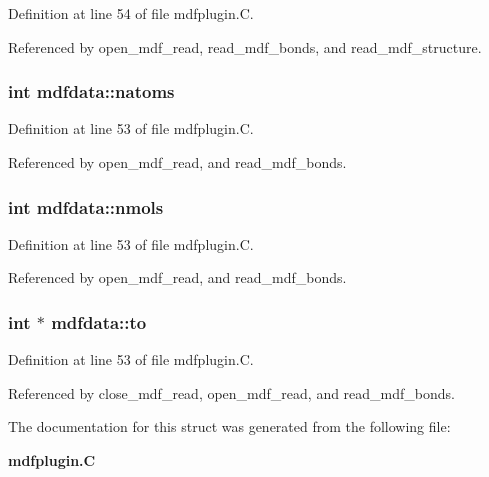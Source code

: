 Definition at line 54 of file mdfplugin.C.

Referenced by open\_\-mdf\_\-read, read\_\-mdf\_\-bonds, and read\_\-mdf\_\-structure.
\subsubsection{\setlength{\rightskip}{0pt plus 5cm}int mdfdata::natoms}\label{structmdfdata_m1}




Definition at line 53 of file mdfplugin.C.

Referenced by open\_\-mdf\_\-read, and read\_\-mdf\_\-bonds.
\subsubsection{\setlength{\rightskip}{0pt plus 5cm}int mdfdata::nmols}\label{structmdfdata_m2}




Definition at line 53 of file mdfplugin.C.

Referenced by open\_\-mdf\_\-read, and read\_\-mdf\_\-bonds.
\subsubsection{\setlength{\rightskip}{0pt plus 5cm}int $\ast$ mdfdata::to}\label{structmdfdata_m4}




Definition at line 53 of file mdfplugin.C.

Referenced by close\_\-mdf\_\-read, open\_\-mdf\_\-read, and read\_\-mdf\_\-bonds.

The documentation for this struct was generated from the following file:\begin{CompactItemize}
\item 
{\bf mdfplugin.C}\end{CompactItemize}
